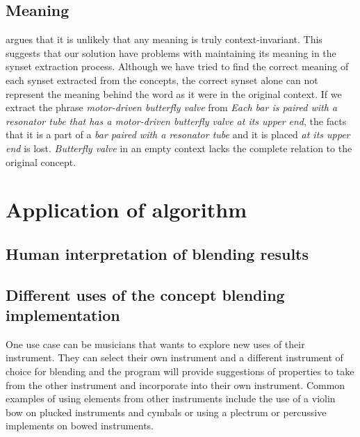 \subsection{Meaning}
\parencite{coulson2001semantic} argues that it is unlikely that any meaning is truly context-invariant. This suggests that our solution have problems with maintaining its meaning in the synset extraction process. Although we have tried to find the correct meaning of each synset extracted from the concepts, the correct synset alone can not represent the meaning behind the word as it were in the original context. If we extract the phrase \emph{motor-driven butterfly valve} from \emph{Each bar is paired with a resonator tube that has a motor-driven butterfly valve at its upper end}, the facts that it is a part of a \emph{bar paired with a resonator tube} and it is placed \emph{at its upper end} is lost. \emph{Butterfly valve} in an empty context lacks the complete relation to the original concept.






\section{Application of algorithm}

\subsection{Human interpretation of blending results}


\subsection{Different uses of the concept blending implementation}
One use case can be musicians that wants to explore new uses of their instrument. They can select their own instrument and a different instrument of choice for blending and the program will provide suggestions of properties to take from the other instrument and incorporate into their own instrument. Common examples of using elements from other instruments include the use of a violin bow on plucked instruments and cymbals or using a plectrum or percussive implements on bowed instruments.

